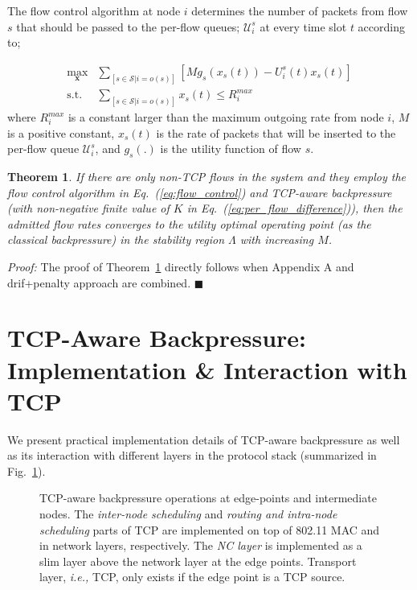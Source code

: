 \documentclass[conference]{IEEEtran}
\newcommand{\ie}{{\em i.e., }}
\newtheorem{theorem}{Theorem}
\newcommand{\Sset}{\mathcal{S}}
\newcommand{\Uset}{\mathcal{U}}
\begin{document}
The flow control algorithm at node $i$ determines the number of packets from flow $s$ that should be passed to the per-flow queues; $\Uset_{i}^{s}$ at every time slot $t$ according to;

\begin{align} \label{eq:flow_control}
\max_{\boldsymbol x} & \sum_{[s \in \Sset | i=o(s)]} [Mg_{s}(x_s(t)) -  U_{i}^{s}(t) x_{s}(t) ] \nonumber \\
\mbox{s.t. } &  \sum_{[s \in \Sset  | i=o(s)]} x_{s}(t) \leq R_{i}^{max}
\end{align} where $R_{i}^{max}$ is a constant larger than the maximum outgoing rate from node $i$, $M$ is a positive constant, $x_s(t)$ is the rate of packets that will be inserted to the per-flow queue $\Uset_{i}^{s}$, and $g_{s}(.)$ is the utility function of flow $s$.

\begin{theorem}\label{theorem2}
If there are only non-TCP flows in the system and they employ the flow control algorithm in Eq.~(\ref{eq:flow_control}) and TCP-aware backpressure (with non-negative finite value of $K$ in Eq.~(\ref{eq:per_flow_difference})), then the admitted flow rates converges to the utility optimal operating point (as the classical backpressure) in the stability region $\Lambda$ with increasing $M$.
\end{theorem}
{\em Proof:} The proof of Theorem~\ref{theorem2} directly follows when Appendix A and drif+penalty approach \cite{neely_mod} are combined. \hfill $\blacksquare$






\section{TCP-Aware Backpressure: Implementation \& Interaction with TCP}\label{sec:algs}
We present practical implementation details of TCP-aware backpressure as well as its interaction with different layers in the protocol stack (summarized in Fig.~\ref{fig:protocol_stack}).

\begin{figure}
\hspace{-5pt}
\centering
{}
\caption{\scriptsize  TCP-aware backpressure operations at edge-points and intermediate nodes. The {\em inter-node scheduling} and {\em routing and intra-node scheduling} parts of TCP are implemented on top of 802.11 MAC and in network layers, respectively. The {\em NC layer} is implemented as a slim layer above the network layer at the edge points. Transport layer, \ie TCP, only exists if the edge point is a TCP source.
}
\vspace{-10pt}
\label{fig:protocol_stack}
\vspace{-20pt}
\end{figure}
\end{document}
